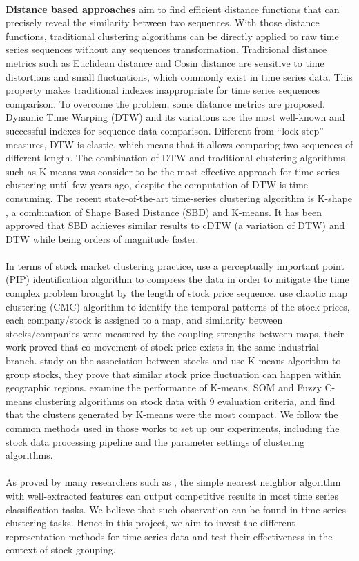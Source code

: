 \\\textbf{Distance based approaches} aim to find efficient distance functions that can precisely reveal the similarity between two sequences. With those distance functions, traditional clustering algorithms can be directly applied to raw time series sequences without any sequences transformation. Traditional distance metrics such as Euclidean distance and Cosin distance are sensitive to time distortions and small fluctuations, which commonly exist in time series data. This property makes traditional indexes inappropriate for time series sequences comparison. To overcome the problem, some distance metrics are proposed. Dynamic Time Warping (DTW) and its variations are the most well-known and successful indexes for sequence data comparison. Different from ``lock-step'' measures, DTW is elastic, which means that it allows comparing two sequences of different length. The combination of DTW and traditional clustering algorithms such as K-means was consider to be the most effective approach for time series clustering until few years ago, despite the computation of DTW is time consuming. The recent state-of-the-art time-series clustering algorithm is K-shape \cite{paparrizos2015k}, a combination of Shape Based Distance (SBD) and K-means. It has been approved that SBD achieves similar results to cDTW (a variation of DTW) and DTW while being orders of magnitude faster.  \\
\\In terms of stock market clustering practice, \cite{fu2001pattern} use a perceptually important point (PIP) identification algorithm to compress the data in order to mitigate the time complex problem brought by the length of stock price sequence. 
\cite{basalto2005clustering} use chaotic map clustering (CMC) algorithm to identify the temporal patterns of the stock prices, each company/stock is assigned to a map, and similarity between stocks/companies were measured by the coupling strengths between maps, their work proved that co-movement of stock price exists in the same industrial branch. \cite{liao2008mining} study on the association between stocks and use K-means algorithm to group stocks, they prove that similar stock price fluctuation can happen within geographic regions. \cite{nanda2010clustering} examine the performance of K-means, SOM and Fuzzy C-means clustering algorithms on stock data with 9 evaluation criteria, and find that the clusters generated by K-means were the most compact. We follow the common methods used in those works to set up our experiments, including the stock data processing pipeline and the parameter settings of clustering algorithms.\\
\\As proved by many researchers such as \cite{ye2009time,wang2013experimental}, the simple nearest neighbor algorithm with well-extracted features can output competitive results in most time series classification tasks. We believe that such observation can be found in time series clustering tasks. Hence in this project, we aim to invest the different representation methods for time series data and test their effectiveness in the context of stock grouping.

